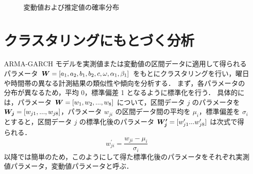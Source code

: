 \documentclass[technicalreport]{ieicej}
\begin{document}
\begin{figure}[tb]
\begin{center}
~
\caption{変動値および推定値の確率分布}
\label{diff-hist}
\end{center}
\end{figure}

\section{クラスタリングにもとづく分析}
 ARMA-GARCH モデルを実測値または変動値の区間データに適用して得られるパラメータ $\mbox{\boldmath $W$} = [a_1, a_2, b_1, b_2, c, \omega, \alpha_1, \beta_1]$ をもとにクラスタリングを行い，曜日や時間帯の異なる計測結果の類似性や傾向を分析する．
 まず，各パラメータの分布が異なるため，平均 0，標準偏差 1 となるように標準化を行う．
具体的には，パラメータ $\mbox{\boldmath $W$} = [w_1,w_2,...,w_8]$ について，区間データ $j$ のパラメータを $\mbox{\boldmath $W_j$} = [w_{j1},...,w_{j8}]$，パラメータ $w_{ji}$ の区間データ間の平均を $\mu_i$，標準偏差を $\sigma_i$ とすると，区間データ $j$ の標準化後のパラメータ $\mbox{\boldmath $W_j^\prime$} = [w_{j1}^\prime...w_{j8}^\prime]$ は次式で得られる．
$$w_{ji}^\prime = \frac{w_{ji} - \mu_i}{\sigma_i}$$
以降では簡単のため，このようにして得た標準化後のパラメータをそれぞれ実測値パラメータ，変動値パラメータと呼ぶ． 
\end{document}
